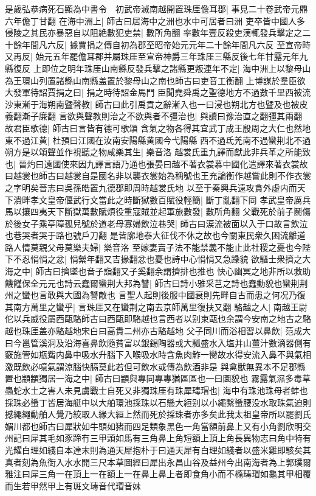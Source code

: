 是歲弘恭病死石顯為中書令　初武帝滅南越開置珠厓儋耳郡|{
	事見二十卷武帝元鼎六年儋丁甘翻}
在海中洲上|{
	師古曰居海中之洲也水中可居者曰洲}
吏卒皆中國人多侵陵之其民亦暴惡自以阻絶數犯吏禁|{
	數所角翻}
率數年壹反殺吏漢輒發兵擊定之二十餘年間凡六反|{
	據賈捐之傳自初為郡至昭帝始元元年二十餘年間凡六反}
至宣帝時又再反|{
	始元五年罷儋耳郡并屬珠厓至宣帝神爵三年珠厓三縣反後七年甘露元年九縣復反}
上即位之明年珠厓山南縣反發兵擊之諸縣更叛連年不定|{
	海中洲上以黎母山為王環山列置諸縣山南縣盖置於黎母山之南也師古曰吏音工衡翻}
上博謀於羣臣欲大發軍待詔賈捐之曰|{
	捐之時待詔金馬門}
臣聞堯舜禹之聖德地方不過數千里西被流沙東漸于海朔南暨聲教|{
	師古曰此引禹貢之辭漸入也一曰浸也朔北方也暨及也被皮義翻漸子廉翻}
言欲與聲教則治之不欲與者不彊治也|{
	與讀曰豫治直之翻彊其兩翻}
故君臣歌德|{
	師古曰言皆有德可歌頌}
含氣之物各得其宜武丁成王殷周之大仁也然地東不過江黄|{
	杜預曰江國在汝南安陽縣黄國今弋陽縣}
西不過氐羌南不過蠻荆北不過朔方是以頌聲並作視聽之物咸樂其生|{
	樂音洛}
越裳氏重九譯而獻此非兵革之所能致也|{
	晉灼曰遠國使來因九譯言語乃通也張晏曰越不著衣裳慕中國化遣譯來著衣裳故曰越裳也師古曰越裳自是國名非以襲衣裳始為稱號也王充論衡作越嘗此則不作衣裳之字明矣晉志曰吳孫皓置九德郡即周時越裳氏地}
以至于秦興兵遠攻貪外虚内而天下潰畔孝文皇帝偃武行文當此之時斷獄數百賦役輕簡|{
	斷丁亂翻下同}
孝武皇帝厲兵馬以攘四夷天下斷獄萬數賦煩役重寇賊並起軍旅數發|{
	數所角翻}
父戰死於前子鬭傷於後女子乘亭障孤兒號於道老母寡婦飲泣巷哭|{
	師古曰涙流被面以入于口故言飲泣也巷哭者哭于路也號戶刀翻}
是皆廓地泰大征伐不休之故也今關東民衆久困流離道路人情莫親父母莫樂夫婦|{
	樂音洛}
至嫁妻賣子法不能禁義不能止此社稷之憂也今陛下不忍悁悁之忿|{
	悁縈年翻又吉掾翻忿也憂也詩中心悁悁又急躁貌}
欲驅士衆擠之大海之中|{
	師古曰擠墜也音子詣翻又子奚翻余謂擠排也推也}
快心幽冥之地非所以救助饑饉保全元元也詩云蠢爾蠻荆大邦為讐|{
	師古曰詩小雅采芑之詩也蠢動貌也蠻荆荆州之蠻也言敢與大國為讐敵也}
言聖人起則後服中國衰則先畔自古而患之何况乃復其南方萬里之蠻乎|{
	言珠厓又在蠻荆之南去京師萬里復扶又翻}
駱越之人|{
	南越王尉佗以兵威役屬西甌駱師古曰西甌即駱越也言西者以别束甌也余謂今安南之地古之駱越也珠厓盖亦駱越地宋白曰高貴二州亦古駱越地}
父子同川而浴相習以鼻飲|{
	范成大曰今邕管溪洞及沿海喜鼻飲隨貧富以銀錫陶器或大瓢盛水入塩并山薑汁數滴器側有竅施管如瓶觜内鼻中吸水升腦下入喉吸水時含魚肉鮓一臠故水得安流入鼻不與氣相激既飲必噫氣謂涼腦快膈莫此若但可飲水或傳為飲酒非是}
與禽獸無異本不足郡縣置也顓顓獨居一海之中|{
	師古曰顓與專同專專猶區區也一曰圜貌也}
霧露氣濕多毒草蟲蛇水土之害人未見虜戰士自死又非獨珠厓有珠犀瑇瑁也|{
	海中有珠池珠母者蚌也採珠必蜑丁皆居海艇中以大舶環池採珠以石懸大絙别以小繩繫蜑腰没水取珠氣迫則撼繩繩動舶人覺乃絞取人緣大絙上然而死於採珠者亦多矣此我太祖皇帝所以罷劉氏媚川都也師古曰犀狀如牛頭如猪而四足類象黑色一角當額前鼻上又有小角劉欣明交州記曰犀其毛如豕蹄冇三甲頭如馬有三角鼻上角短額上頂上角長異物志曰角中特有光耀白理如綫自本達末則為通天犀抱朴于曰通天犀有白理如綫者以盛米雞即駭矣其真者刻為魚衘入水水開三尺本草圖經曰犀出永昌山谷及益州今出南海者為上郭璞爾雅注曰犀三角一在頂上一在額上一在鼻上鼻上者即食角小而不橢瑇瑁如龜其甲相覆而生若甲然甲上有斑文瑇音代瑁音妹}

